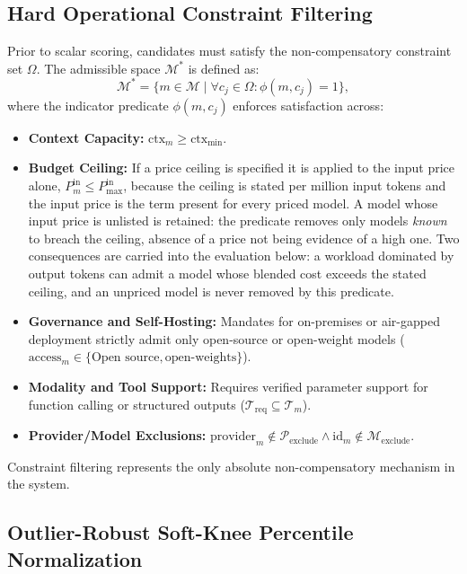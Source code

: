 \documentclass[pdflatex,sn-mathphys-num]{sn-jnl}
\theoremstyle{thmstyleone}
\theoremstyle{thmstylethree}
\begin{document}
\subsection{Hard Operational Constraint Filtering}\label{subsec:filtering}

Prior to scalar scoring, candidates must satisfy the non-compensatory constraint set $\Omega$. The admissible space $\mathcal{M}^*$ is defined as:
\begin{equation}\label{eq:filtering}
\mathcal{M}^* = \{ m \in \mathcal{M} \mid \forall c_j \in \Omega : \phi(m, c_j) = 1 \},
\end{equation}
where the indicator predicate $\phi(m, c_j)$ enforces satisfaction across:
\begin{itemize}
  \item \textbf{Context Capacity:} $\text{ctx}_m \ge \text{ctx}_{\min}$.
  \item \textbf{Budget Ceiling:} If a price ceiling is specified it is applied to the input price alone, $P_m^{\text{in}} \le P_{\max}^{\text{in}}$, because the ceiling is stated per million input tokens and the input price is the term present for every priced model. A model whose input price is unlisted is retained: the predicate removes only models \emph{known} to breach the ceiling, absence of a price not being evidence of a high one. Two consequences are carried into the evaluation below: a workload dominated by output tokens can admit a model whose blended cost exceeds the stated ceiling, and an unpriced model is never removed by this predicate.
  \item \textbf{Governance and Self-Hosting:} Mandates for on-premises or air-gapped deployment strictly admit only open-source or open-weight models ($\text{access}_m \in \{\text{Open source}, \text{open-weights}\}$).
  \item \textbf{Modality and Tool Support:} Requires verified parameter support for function calling or structured outputs ($\mathcal{T}_{\text{req}} \subseteq \mathcal{T}_m$).
  \item \textbf{Provider/Model Exclusions:} $\text{provider}_m \notin \mathcal{P}_{\text{exclude}} \land \text{id}_m \notin \mathcal{M}_{\text{exclude}}$.
\end{itemize}
Constraint filtering represents the only absolute non-compensatory mechanism in the system.

\subsection{Outlier-Robust Soft-Knee Percentile Normalization}\label{subsec:normalization}
\end{document}
